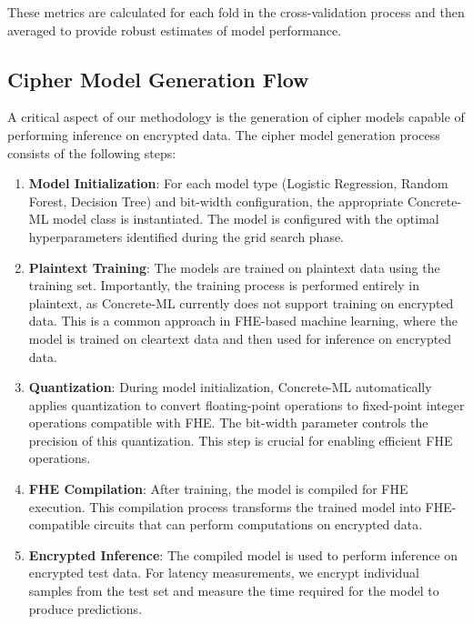 \documentclass[a4paper,12pt]{article}
\begin{document}
These metrics are calculated for each fold in the cross-validation process and then averaged to provide robust estimates of model performance.

\subsection{Cipher Model Generation Flow}
A critical aspect of our methodology is the generation of cipher models capable of performing inference on encrypted data. The cipher model generation process consists of the following steps:

\begin{enumerate}
    \item \textbf{Model Initialization}: For each model type (Logistic Regression, Random Forest, Decision Tree) and bit-width configuration, the appropriate Concrete-ML model class is instantiated. The model is configured with the optimal hyperparameters identified during the grid search phase.
    
    \item \textbf{Plaintext Training}: The models are trained on plaintext data using the training set. Importantly, the training process is performed entirely in plaintext, as Concrete-ML currently does not support training on encrypted data. This is a common approach in FHE-based machine learning, where the model is trained on cleartext data and then used for inference on encrypted data.
    
    \item \textbf{Quantization}: During model initialization, Concrete-ML automatically applies quantization to convert floating-point operations to fixed-point integer operations compatible with FHE. The bit-width parameter controls the precision of this quantization. This step is crucial for enabling efficient FHE operations.
    
    \item \textbf{FHE Compilation}: After training, the model is compiled for FHE execution. This compilation process transforms the trained model into FHE-compatible circuits that can perform computations on encrypted data.
    
    \item \textbf{Encrypted Inference}: The compiled model is used to perform inference on encrypted test data. For latency measurements, we encrypt individual samples from the test set and measure the time required for the model to produce predictions.
\end{enumerate}
\end{document}
